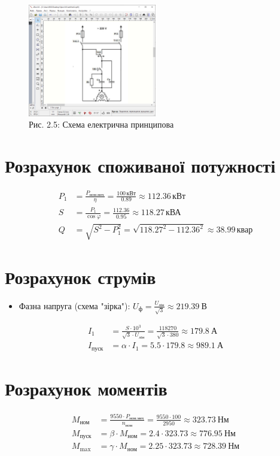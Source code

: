\documentclass[a4paper]{article}
\begin{document}
\begin{figure}[h]
    \centering
    \includegraphics[width=0.5\textwidth]{imgs/LW2.4.2.png}
    \caption*{Рис. 2.5: Схема електрична принципова}
\end{figure}

\newpage


\section*{Розрахунок споживаної потужності}
\begin{align*}
P_1 &= \frac{P_{\text{ном.мех}}}{\eta} = \frac{100\,\text{кВт}}{0.89} \approx 112.36\,\text{кВт} \\
S &= \frac{P_1}{\cos \varphi} = \frac{112.36}{0.95} \approx 118.27\,\text{кВА} \\
Q &= \sqrt{S^2 - P_1^2} = \sqrt{118.27^2 - 112.36^2} \approx 38.99\,\text{квар}
\end{align*}

\section*{Розрахунок струмів}
\begin{itemize}
    \item Фазна напруга (схема "зірка"): $U_{\text{ф}} = \frac{U_{\text{лін}}}{\sqrt{3}} \approx 219.39\ \text{В}$
\end{itemize}
\begin{align*}
I_1 &= \frac{S \cdot 10^3}{\sqrt{3} \cdot U_{\text{лін}}} = \frac{118270}{\sqrt{3} \cdot 380} \approx 179.8\ \text{А} \\
I_{\text{пуск}} &= \alpha \cdot I_1 = 5.5 \cdot 179.8 \approx 989.1\ \text{А}
\end{align*}

\section*{Розрахунок моментів}
\begin{align*}
M_{\text{ном}} &= \frac{9550 \cdot P_{\text{ном.мех}}}{n_{\text{ном}}} = \frac{9550 \cdot 100}{2950} \approx 323.73\ \text{Нм} \\
M_{\text{пуск}} &= \beta \cdot M_{\text{ном}} = 2.4 \cdot 323.73 \approx 776.95\ \text{Нм} \\
M_{\text{max}} &= \gamma \cdot M_{\text{ном}} = 2.25 \cdot 323.73 \approx 728.39\ \text{Нм}
\end{align*}
\end{document}
